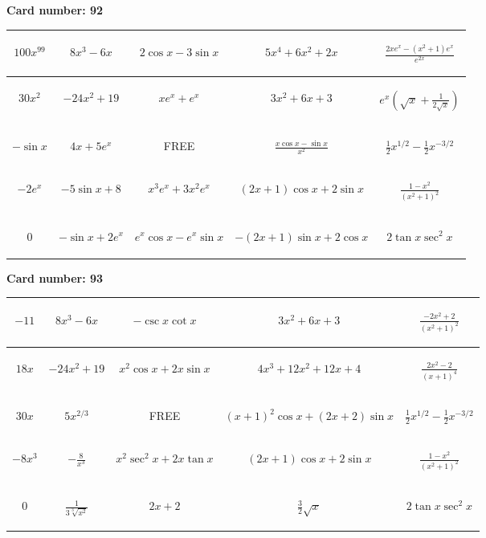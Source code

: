 \documentclass{article}
\newcommand{\entry}[1]{\begin{minipage}[t][2.75cm][t]{4cm} \vspace{1cm} \begin{center}#1\end{center} \end{minipage}}
\newcommand{\freespace}{\entry{FREE}}
\newcommand{\cardnumber}[1]{\noindent \textbf{Card number: #1} \bigskip}
\begin{document}
\pagebreak

\cardnumber{92}
\begin{center}
\begin{tabular}{|*{5}{c|}}
    \hline
    \entry{$100x^{99}$} & \entry{$8x^3 - 6x$} & \entry{$2 \cos x - 3 \sin x$} & \entry{$5x^4 + 6x^2 + 2x$} & \entry{$\frac{2x e^x - (x^2 + 1) e^x}{e^{2x}}$} \\ \hline
    \entry{$30x^2$} & \entry{$-24x^2 + 19$} & \entry{$x e^x + e^x$} & \entry{$3x^2 + 6x + 3$} & \entry{$e^x \left(\sqrt{x} + \frac{1}{2\sqrt{x}}\right)$} \\ \hline
    \entry{$-\sin x$} & \entry{$4x + 5e^x$} & \freespace & \entry{$\frac{x \cos x - \sin x}{x^2}$} & \entry{$\frac{1}{2} x^{1/2} - \frac{1}{2} x^{-3/2}$} \\ \hline
    \entry{$-2e^x$} & \entry{$-5 \sin x + 8$} & \entry{$x^3 e^x + 3x^2 e^x$} & \entry{$(2x + 1) \cos x + 2 \sin x$} & \entry{$\frac{1 - x^2}{(x^2 + 1)^2}$} \\ \hline
    \entry{$0$} & \entry{$-\sin x + 2e^x$} & \entry{$e^x \cos x - e^x \sin x$} & \entry{$-(2x + 1) \sin x + 2 \cos x$} & \entry{$2 \tan x \sec^2 x$} \\ \hline
\end{tabular}
\end{center}

\pagebreak

\cardnumber{93}
\begin{center}
\begin{tabular}{|*{5}{c|}}
    \hline
    \entry{$-11$} & \entry{$8x^3 - 6x$} & \entry{$-\csc x \cot x$} & \entry{$3x^2 + 6x + 3$} & \entry{$\frac{-2x^2 + 2}{(x^2 + 1)^2}$} \\ \hline
    \entry{$18x$} & \entry{$-24x^2 + 19$} & \entry{$x^2 \cos x + 2x \sin x$} & \entry{$4x^3 + 12x^2 + 12x + 4$} & \entry{$\frac{2x^2 - 2}{(x + 1)^4}$} \\ \hline
    \entry{$30x$} & \entry{$5x^{2/3}$} & \freespace & \entry{$(x + 1)^2 \cos x + (2x + 2) \sin x$} & \entry{$\frac{1}{2} x^{1/2} - \frac{1}{2} x^{-3/2}$} \\ \hline
    \entry{$-8x^3$} & \entry{$-\frac{8}{x^3}$} & \entry{$x^2 \sec^2 x + 2x \tan x$} & \entry{$(2x + 1) \cos x + 2 \sin x$} & \entry{$\frac{1 - x^2}{(x^2 + 1)^2}$} \\ \hline
    \entry{$0$} & \entry{$\frac{1}{3\sqrt[3]{x^2}}$} & \entry{$2x + 2$} & \entry{$\frac{3}{2} \sqrt{x}$} & \entry{$2 \tan x \sec^2 x$} \\ \hline
\end{tabular}
\end{center}
\end{document}
